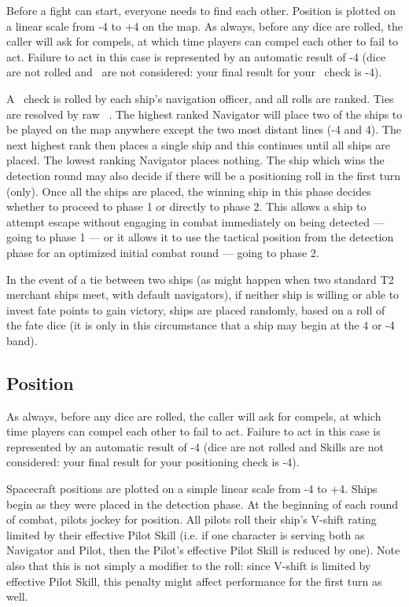 Before a fight can start, everyone needs to find each other. Position is plotted on a linear scale from -4 to +4 on the map. As always, before any dice are rolled, the caller will ask for compels, at which time players can compel each other to fail to act. Failure to act in this case is represented by an automatic result of -4 (dice are not rolled and \Skills\ are not considered: your final result for your \Navigation\ check is -4).

A \Navigation\ check is rolled by each ship's navigation officer, and all rolls are ranked. Ties are resolved by raw \Navigation\ \Skill. The highest ranked Navigator will place two of the ships to be played on the map anywhere except the two most distant lines (-4 and 4). The next highest rank then places a single ship and this continues until all ships are placed. The lowest ranking Navigator places nothing. The ship which wins the detection round may also decide if there will be a positioning roll in the first turn (only). Once all the ships are placed, the winning ship in this phase decides whether to proceed to phase 1 or directly to phase 2. This allows a ship to attempt escape without engaging in combat immediately on being detected --- going to phase 1 --- or it allows it to use the tactical position from the detection phase for an optimized initial combat round --- going to phase 2.

In the event of a tie between two ships (as might happen when two standard T2 merchant ships meet, with default navigators), if neither ship is willing or able to invest fate points to gain victory, ships are placed randomly, based on a roll of the fate dice (it is only in this circumstance that a ship may begin at the 4 or -4 band).

\subsection{Position}\label{sec:Position} %

As always, before any dice are rolled, the caller will ask for compels, at which time players can compel each other to fail to act. Failure to act in this case is represented by an automatic result of -4 (dice are not rolled and Skills are not considered: your final result for your positioning check is -4).

Spacecraft positions are plotted on a simple linear scale from -4 to +4. Ships begin as they were placed in the detection phase. At the beginning of each round of combat, pilots jockey for position. All pilots roll their ship's V-shift rating limited by their effective Pilot Skill (i.e. if one character is serving both as Navigator and Pilot, then the Pilot's effective Pilot Skill is reduced by one). Note also that this is not simply a modifier to the roll: since V-shift is limited by effective Pilot Skill, this penalty might affect performance for the first turn as well.

